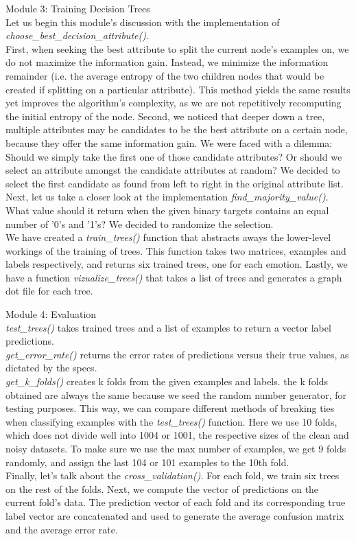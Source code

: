 Module 3: Training Decision Trees \\
Let us begin this module's discussion with the implementation of \emph{choose\_best\_decision\_attribute()}. \\
First, when seeking the best attribute to split the current node's examples on, we do not maximize the information gain.
Instead, we minimize the information remainder (i.e. the average entropy of the two children nodes
that would be created if splitting on a particular attribute).
This method yields the same results yet improves the algorithm's complexity,
as we are not repetitively recomputing the initial entropy of the node.
Second, we noticed that deeper down a tree, multiple attributes may be candidates to be the best attribute on a certain node,
because they offer the same information gain. We were faced with a dilemma: Should we simply
take the first one of those candidate attributes? Or should we select an attribute amongst the candidate attributes at random?
We decided to select the first candidate as found from left to right in the original attribute list.\\
Next, let us take a closer look at the implementation \emph{find\_majority\_value()}.\\
What value should it return when the given binary targets contains an equal number of
'0's and '1's? We decided to randomize the selection.\\
We have created a \emph{train\_trees()} function that abstracts aways the lower-level workings of the training
of trees. This function takes two matrices, examples and labels respectively,
and returns six trained trees, one for each emotion.
Lastly, we have a function \emph{vizualize\_trees()} that takes a list of trees and generates a graph dot file
for each tree.

Module 4: Evaluation \\
\emph{test\_trees()} takes trained trees and a list of examples to return a vector label predictions.\\
\emph{get\_error\_rate()} returns the error rates of predictions versus their true values, as dictated by the specs.\\
\emph{get\_k\_folds()} creates k folds from the given examples and labels. the k folds obtained are always the same
because we seed the random number generator, for testing purposes.
This way, we can compare different methods of breaking ties when classifying examples with the \emph{test\_trees()} function.
Here we use 10 folds, which does not divide well into 1004 or 1001, the respective sizes of the clean and noisy datasets.
To make sure we use the max number of examples, we get 9 folds randomly, and assign the last 104 or 101 examples to the
10th fold.\\
Finally, let's talk about the \emph{cross\_validation()}.
For each fold, we train six trees on the rest of the folds. Next, we compute the vector of predictions on the current fold's data.
The prediction vector of each fold and its corresponding true label vector are concatenated and used to generate the average confusion
matrix and the average error rate.
